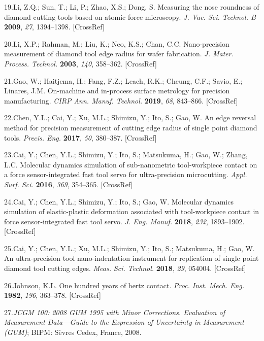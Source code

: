 \documentclass{article}
\begin{document}
\begin{hangpars}
19.\enspace Li, Z.Q.; Sun, T.; Li, P.; Zhao, X.S.; Dong, S. Measuring the nose roundness of diamond cutting tools based on atomic force microscopy. \emph{J. Vac. Sci. Technol. B} \textbf{2009}, \emph{27}, 1394–1398. [CrossRef]

20.\enspace Li, X.P.; Rahman, M.; Liu, K.; Neo, K.S.; Chan, C.C. Nano-precision measurement of diamond tool edge radius for wafer fabrication. \emph{J. Mater. Process. Technol.} \textbf{2003}, \emph{140}, 358–362. [CrossRef]

21.\enspace Gao, W.; Haitjema, H.; Fang, F.Z.; Leach, R.K.; Cheung, C.F.; Savio, E.; Linares, J.M. On-machine and in-process surface metrology for precision manufacturing. \emph{CIRP Ann. Manuf. Technol.} \textbf{2019}, \emph{68}, 843–866. [CrossRef]

22.\enspace Chen, Y.L.; Cai, Y.; Xu, M.L.; Shimizu, Y.; Ito, S.; Gao, W. An edge reversal method for precision measurement of cutting edge radius of single point diamond tools. \emph{Precis. Eng.} \textbf{2017}, \emph{50}, 380–387. [CrossRef]

23.\enspace Cai, Y.; Chen, Y.L.; Shimizu, Y.; Ito, S.; Matsukuma, H.; Gao, W.; Zhang, L.C. Molecular dynamics simulation of sub-nanometric tool-workpiece contact on a force sensor-integrated fast tool servo for ultra-precision microcutting. \emph{Appl. Surf. Sci.} \textbf{2016}, \emph{369}, 354–365. [CrossRef]

24.\enspace Cai, Y.; Chen, Y.L.; Shimizu, Y.; Ito, S.; Gao, W. Molecular dynamics simulation of elastic-plastic deformation associated with tool-workpiece contact in force sensor-integrated fast tool servo. \emph{J. Eng. Manuf.} \textbf{2018}, \emph{232}, 1893–1902. [CrossRef]

25.\enspace Cai, Y.; Chen, Y.L.; Xu, M.L.; Shimizu, Y.; Ito, S.; Matsukuma, H.; Gao, W. An ultra-precision tool nano-indentation instrument for replication of single point diamond tool cutting edges. \emph{Meas. Sci. Technol.} \textbf{2018}, \emph{29}, 054004. [CrossRef]

26.\enspace Johnson, K.L. One hundred years of hertz contact. \emph{Proc. Inst. Mech. Eng.} \textbf{1982}, \emph{196}, 363–378. [CrossRef]

27.\enspace \emph{JCGM 100: 2008 GUM 1995 with Minor Corrections. Evaluation of Measurement Data—Guide to the Expression of Uncertainty in Measurement (GUM)}; BIPM: Sèvres Cedex, France, 2008.
\end{hangpars}

\medskip
{}
\end{document}
